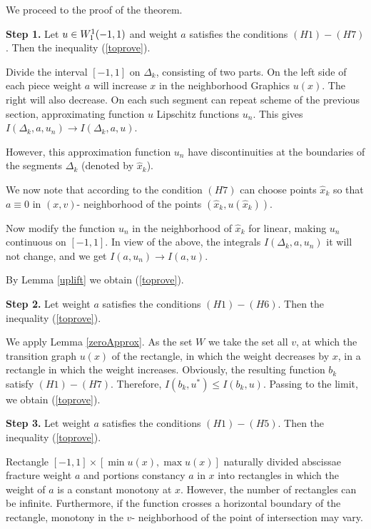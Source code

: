 We proceed to the proof of the theorem.

\bigskip
{\bf Step 1.} Let $u \in W_1^1(-1, 1)$ and weight $a$ satisfies the conditions $(H1)-(H7)$.
Then the inequality (\ref{toprove}).

Divide the interval $[-1, 1]$ on $\Delta_k$, consisting of two parts.
On the left side of each piece weight $a$ will increase $x$ in the neighborhood
Graphics $u(x)$. The right will also decrease.
On each such segment can repeat scheme of the previous section,
approximating function $u$ Lipschitz functions $u_n$.
This gives $I(\Delta_k, a, u_n) \to I(\Delta_k, a, u)$.

However, this approximation function $u_n$ have discontinuities at the boundaries of the segments $\Delta_k$
(denoted by $\hat{x}_k$).

We now note that according to the condition $(H7)$ can choose points $\hat{x}_k$ so
that $a \equiv 0$ in $(x, v)$- neighborhood of the points $(\hat{x}_k, u(\hat{x}_k))$.

Now modify the function $u_n$ in the neighborhood of $\hat{x}_k$ for linear,
making $u_n$ continuous on $[-1, 1]$.
In view of the above, the integrals $I(\Delta_k, a, u_n)$ it will not change,
and we get $I(a, u_n) \to I(a, u)$.

By Lemma \ref{uplift} we obtain (\ref{toprove}).

\bigskip

{\bf Step 2.} Let weight $a$ satisfies the conditions $(H1)-(H6)$.
Then the inequality (\ref{toprove}).

We apply Lemma \ref{zeroApprox}. As the set $W$ we take the set
all $v$, at which the transition graph $u(x)$ of the rectangle,
in which the weight decreases by $x$, in a rectangle in which the weight increases.
Obviously, the resulting function $b_k$ satisfy $(H1)-(H7)$.
Therefore, $I(b_k, u^*) \le I(b_k, u)$.
Passing to the limit, we obtain (\ref{toprove}).

\bigskip

{\bf Step 3.} Let weight $a$ satisfies the conditions $(H1)-(H5)$.
Then the inequality (\ref{toprove}).

Rectangle $[-1, 1] \times [\min u(x), \max u(x)]$ naturally
divided abscissae fracture weight $a$ and portions constancy $a$ in $x$ into rectangles
in which the weight of $a$ is a constant monotony at $x$.
However, the number of rectangles can be infinite.
Furthermore, if the function crosses a horizontal boundary of the rectangle,
monotony in the $v$- neighborhood of the point of intersection may vary.

